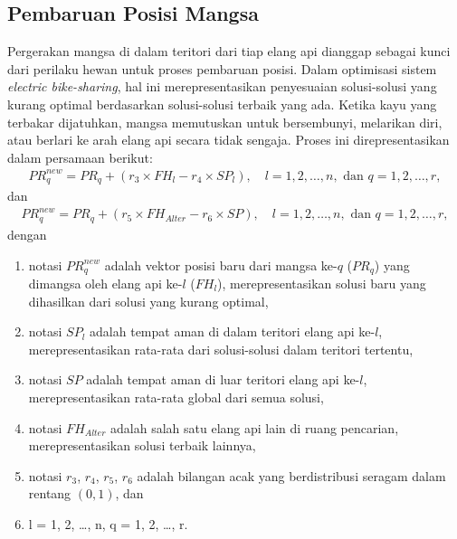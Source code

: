 \subsection{Pembaruan Posisi Mangsa}
Pergerakan mangsa di dalam teritori dari tiap elang api dianggap sebagai kunci dari perilaku hewan untuk proses pembaruan posisi. Dalam optimisasi sistem \textit{electric bike-sharing}, hal ini merepresentasikan penyesuaian solusi-solusi yang kurang optimal berdasarkan solusi-solusi terbaik yang ada. Ketika kayu yang terbakar dijatuhkan, mangsa memutuskan untuk bersembunyi, melarikan diri, atau berlari ke arah elang api secara tidak sengaja. Proses ini direpresentasikan dalam persamaan berikut:
\begin{align}
    PR_q^{\textit{new}}=PR_q+(r_3\times FH_l-r_4\times SP_l), \quad l = 1, 2, \ldots, n,  \text{ dan } q = 1, 2, \ldots, r,
\end{align}
dan
\begin{align}
    PR_q^{\textit{new}}=PR_q+(r_5\times FH_{Alter}-r_6\times SP), \quad l = 1, 2, \ldots, n,  \text{ dan } q = 1, 2, \ldots, r,
\end{align}
dengan
\begin{enumerate}
    \item notasi $PR_q^{\textit{new}}$ adalah vektor posisi baru dari mangsa ke-$q$ ($PR_q$) yang dimangsa oleh elang api ke-$l$ ($FH_l$), merepresentasikan solusi baru yang dihasilkan dari solusi yang kurang optimal,
    \item notasi $SP_l$ adalah tempat aman di dalam teritori elang api ke-$l$, merepresentasikan rata-rata dari solusi-solusi dalam teritori tertentu,
    \item notasi $SP$ adalah tempat aman di luar teritori elang api ke-$l$, merepresentasikan rata-rata global dari semua solusi,
    \item notasi $FH_{Alter}$ adalah salah satu elang api lain di ruang pencarian, merepresentasikan solusi terbaik lainnya,
    \item notasi $r_3$, $r_4$, $r_5$, $r_6$ adalah bilangan acak yang berdistribusi seragam dalam rentang $(0,1)$, dan
    \item l = 1, 2, \ldots, n,   q = 1, 2, \ldots, r.
\end{enumerate}

